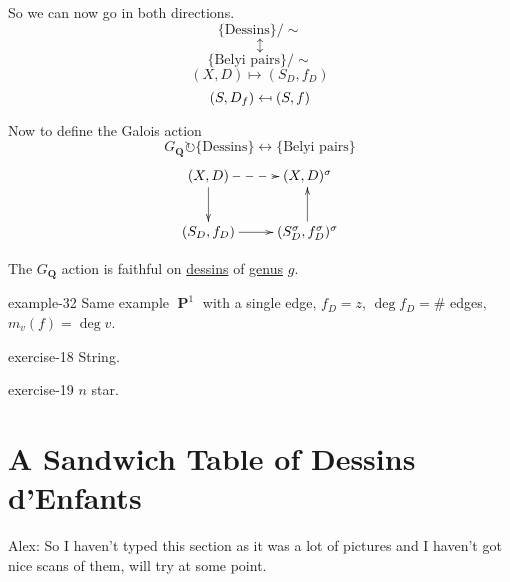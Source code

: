 \documentclass[10pt,]{book}
\numberwithin{equation}{section}
\providecommand\mapsfrom{\mathrel{\reflectbox{\ensuremath{\mapsto}}}}
\newcommand{\QQ}{\mathbf{Q}}
\newcommand{\acts}{\circlearrowright}
\DeclareMathOperator{\PP}{\mathbf{P}}
\begin{document}
So we can now go in both directions.%
\begin{equation*}
\{\text{Dessins}\}/\sim
\end{equation*}
%
\begin{equation*}
\updownarrow
\end{equation*}
%
\begin{equation*}
\{\text{Belyi pairs}\}/\sim
\end{equation*}
%
\begin{equation*}
(X,D) \mapsto (S_D, f_D)
\end{equation*}
%
\begin{equation*}
(S, D_f) \mapsfrom (S,f)
\end{equation*}
%
\par
\hypertarget{p-659}{}%
Now to define the Galois action%
\begin{equation*}
G_\QQ\acts \{\text{Dessins}\}\leftrightarrow \{\text{Belyi pairs}\}
\end{equation*}
%
\begin{equation*}
\xymatrix{
(X,D)\ar[d] \ar@{-->}[r] & (X,D)^\sigma \\
(S_D,f_D)\ar[r] & (S_D^\sigma,f_D^\sigma)^\sigma \ar[u]
}
\end{equation*}
%
\par
\hypertarget{p-660}{}%
The \(G_\QQ\) action is faithful on \hyperref[def-dessin-denfant]{dessins} of \hyperref[fact-existance-genus]{genus} \(g\).%
\begin{example}{}{example-32}%
\hypertarget{p-661}{}%
Same example \(\PP^1\) with a single edge, \(f_D  = z\), \(\deg f_D = \#\) edges, \(m_v(f)=  \deg v\).%
\end{example}
\begin{inlineexercise}{}{exercise-18}%
\hypertarget{p-662}{}%
String.%
\end{inlineexercise}
\begin{inlineexercise}{}{exercise-19}%
\hypertarget{p-663}{}%
\(n\) star.%
\end{inlineexercise}
%
%
\typeout{************************************************}
\typeout{************************************************}
%
\section[{A Sandwich Table of Dessins d'Enfants}]{A Sandwich Table of Dessins d'Enfants}\label{sec-sandwich}
\hypertarget{p-664}{}%
Alex: So I haven't typed this section as it was a lot of pictures and I haven't got nice scans of them, will try at some point.%
%
%
\typeout{************************************************}
\typeout{************************************************}
%
\end{document}

